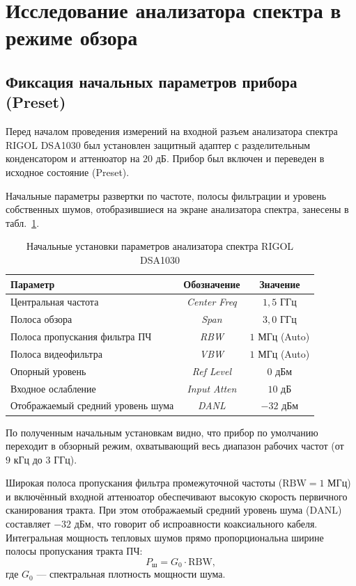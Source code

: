 \section{Исследование анализатора спектра в режиме обзора}
\subsection{Фиксация начальных параметров прибора (Preset)}
Перед началом проведения измерений на входной разъем анализатора спектра RIGOL DSA1030 был установлен защитный адаптер с разделительным конденсатором и аттенюатор на $20\text{ дБ}$. Прибор был включен и переведен в исходное состояние (Preset).

Начальные параметры развертки по частоте, полосы фильтрации и уровень собственных шумов, отобразившиеся на экране анализатора спектра, занесены в табл.~\ref{tab:initial_settings}.

\begin{table}[H]
    \caption{Начальные установки параметров анализатора спектра RIGOL DSA1030}
    \label{tab:initial_settings}
    \begin{tabular}{l c c}
        \toprule
        \textbf{Параметр} & \textbf{Обозначение} & \textbf{Значение} \\
        \midrule
        Центральная частота & \textit{Center Freq} & $1{,}5\text{ ГГц}$ \\
        Полоса обзора & \textit{Span} & $3{,}0\text{ ГГц}$ \\
        Полоса пропускания фильтра ПЧ & \textit{RBW} & $1\text{ МГц}$ (Auto) \\
        Полоса видеофильтра & \textit{VBW} & $1\text{ МГц}$ (Auto) \\
        Опорный уровень & \textit{Ref Level} & $0\text{ дБм}$ \\
        Входное ослабление & \textit{Input Atten} & $10\text{ дБ}$ \\
        Отображаемый средний уровень шума & \textit{DANL} & $-32\text{ дБм}$ \\
        \bottomrule
    \end{tabular}
\end{table}
По полученным начальным установкам видно, что прибор по умолчанию переходит в обзорный режим, охватывающий весь диапазон рабочих частот (от $9\text{ кГц}$ до $3\text{ ГГц}$). 

Широкая полоса пропускания фильтра промежуточной частоты ($\text{RBW} = 1\text{ МГц}$) и включённый входной аттенюатор обеспечивают высокую скорость первичного сканирования тракта. При этом отображаемый средний уровень шума ($\text{DANL}$) составляет $-32\text{ дБм}$, что говорит об испроавности коаксиального кабеля. Интегральная мощность тепловых шумов прямо пропорциональна ширине полосы пропускания тракта ПЧ:
\begin{equation}
    P_{\text{ш}} = G_0 \cdot \text{RBW},
\end{equation}
где $G_0$ --- спектральная плотность мощности шума. 

